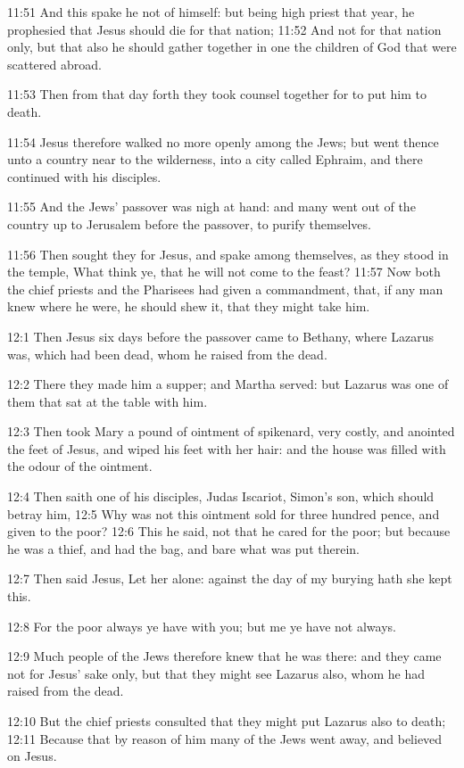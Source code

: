 11:51 And this spake he not of himself: but being high priest that
year, he prophesied that Jesus should die for that nation; 11:52 And
not for that nation only, but that also he should gather together in
one the children of God that were scattered abroad.

11:53 Then from that day forth they took counsel together for to put
him to death.

11:54 Jesus therefore walked no more openly among the Jews; but went
thence unto a country near to the wilderness, into a city called
Ephraim, and there continued with his disciples.

11:55 And the Jews' passover was nigh at hand: and many went out of
the country up to Jerusalem before the passover, to purify themselves.

11:56 Then sought they for Jesus, and spake among themselves, as they
stood in the temple, What think ye, that he will not come to the
feast?  11:57 Now both the chief priests and the Pharisees had given a
commandment, that, if any man knew where he were, he should shew it,
that they might take him.

12:1 Then Jesus six days before the passover came to Bethany, where
Lazarus was, which had been dead, whom he raised from the dead.

12:2 There they made him a supper; and Martha served: but Lazarus was
one of them that sat at the table with him.

12:3 Then took Mary a pound of ointment of spikenard, very costly, and
anointed the feet of Jesus, and wiped his feet with her hair: and the
house was filled with the odour of the ointment.

12:4 Then saith one of his disciples, Judas Iscariot, Simon's son,
which should betray him, 12:5 Why was not this ointment sold for three
hundred pence, and given to the poor?  12:6 This he said, not that he
cared for the poor; but because he was a thief, and had the bag, and
bare what was put therein.

12:7 Then said Jesus, Let her alone: against the day of my burying
hath she kept this.

12:8 For the poor always ye have with you; but me ye have not always.

12:9 Much people of the Jews therefore knew that he was there: and
they came not for Jesus' sake only, but that they might see Lazarus
also, whom he had raised from the dead.

12:10 But the chief priests consulted that they might put Lazarus also
to death; 12:11 Because that by reason of him many of the Jews went
away, and believed on Jesus.

